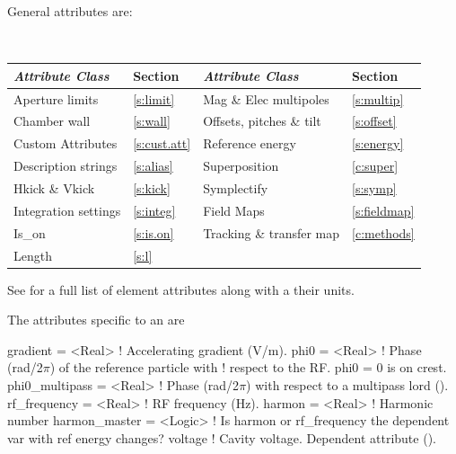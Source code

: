 General  attributes are:
\begin{center}
\tt
\begin{tabular}{llll} \toprule
  {\sl Attribute Class}      & Section           & {\sl Attribute Class}      & Section            \\ \midrule
  Aperture limits            & \ref{s:limit}     & Mag \& Elec multipoles     & \ref{s:multip}     \\
  Chamber wall               & \ref{s:wall}      & Offsets, pitches \& tilt   & \ref{s:offset}     \\
  Custom Attributes          & \ref{s:cust.att}  & Reference energy           & \ref{s:energy}     \\ 
  Description strings        & \ref{s:alias}     & Superposition              & \ref{c:super}      \\
  Hkick \& Vkick             & \ref{s:kick}      & Symplectify                & \ref{s:symp}       \\
  Integration settings       & \ref{s:integ}     & Field Maps                 & \ref{s:fieldmap}   \\
  Is_on                      & \ref{s:is.on}     & Tracking \& transfer map   & \ref{c:methods}    \\
  Length                     & \ref{s:l}         &                            &                    \\
  \bottomrule
\end{tabular}
\end{center}
\toffset
See  for a full list of element attributes along with a their units.

The attributes specific to an  are 
\begin{example}
  gradient        = <Real>    ! Accelerating gradient (V/m).
  phi0            = <Real>    ! Phase (rad/2\(\pi\)) of the reference particle with 
                              !   respect to the RF. phi0 = 0 is on crest.
  phi0_multipass  = <Real>    ! Phase (rad/2\(\pi\)) with respect to a multipass lord ().
  rf_frequency    = <Real>    ! RF frequency (Hz).
  harmon          = <Real>    ! Harmonic number
  harmon_master   = <Logic>   ! Is harmon or rf_frequency the dependent var with ref energy changes?
  voltage                     ! Cavity voltage. Dependent attribute ().
\end{example}

